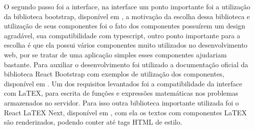 O segundo passo foi a interface, na interface um ponto importante foi a utilização da biblioteca 
bootstrap, disponível em \cite{react:bootstrap}, a motivação da escolha dessa biblioteca e 
utilização de seus componentes foi o fato dos componentes possuírem um design agradável, sua 
compatibilidade com typescript, outro ponto importante para a escolha é que ela possui vários 
componentes muito utilizados no desenvolvimento web, por se tratar de uma aplicação simples esses 
componentes ajudariam bastante. Para auxiliar o desenvolvimento foi utilizado a documentação 
oficial da biblioteca React Bootstrap com exemplos de utilização dos componentes, disponível em 
\cite{doc:react:bootstrap}. Um dos requisitos levantados foi a compatibilidade da interface com 
LaTEX, para escrita de funções e expressões matemáticas nos problemas armazenados no servidor. Para 
isso outra biblioteca importante utilizada foi o React LaTEX Next, disponível em \cite
{repo:react:latex:next}, com ela os textos com componentes LaTEX são renderizados, podendo conter 
até tags HTML de estilo.
